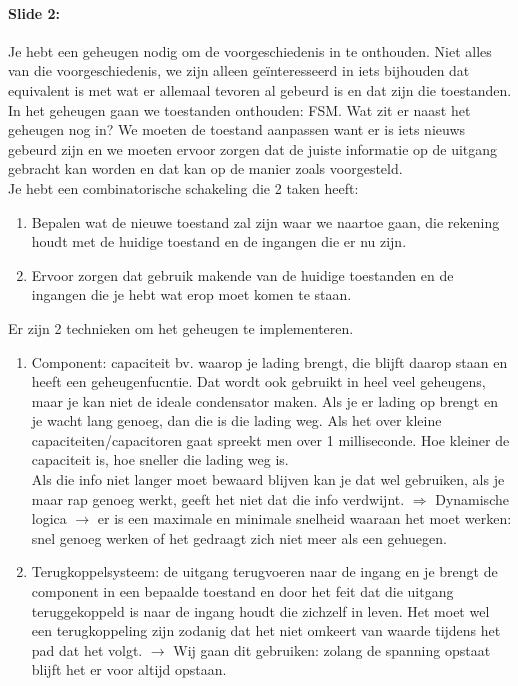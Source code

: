 \documentclass[10pt,a4paper]{book}
\begin{document}
\paragraph{Slide 2:} Je hebt een geheugen nodig om de voorgeschiedenis in te onthouden. Niet alles van die voorgeschiedenis, we zijn alleen ge\"interesseerd in iets bijhouden dat equivalent is met wat er allemaal tevoren al gebeurd is en dat zijn die toestanden. In het geheugen gaan we toestanden onthouden: FSM. Wat zit er naast het geheugen nog in? We moeten de toestand aanpassen want er is iets nieuws gebeurd zijn en we moeten ervoor zorgen dat de juiste informatie op de uitgang gebracht kan worden en dat kan op de manier zoals voorgesteld.\\
Je hebt een combinatorische schakeling die 2 taken heeft:
\begin{enumerate}
\item Bepalen wat de nieuwe toestand zal zijn waar we naartoe gaan, die rekening houdt met de huidige toestand en de ingangen die er nu zijn.	
\item Ervoor zorgen dat gebruik makende van de huidige toestanden en de ingangen die je hebt wat erop moet komen te staan.
\end{enumerate}	
Er zijn 2 technieken om het geheugen te implementeren.
\begin{enumerate}
\item Component: capaciteit bv. waarop je lading brengt, die blijft daarop staan en heeft een geheugenfucntie. Dat wordt ook gebruikt in heel veel geheugens, maar je kan niet de ideale condensator maken. Als je er lading op brengt en je wacht lang genoeg, dan die is die lading weg. Als het over kleine capaciteiten/capacitoren gaat spreekt men over 1 milliseconde. Hoe kleiner de capaciteit is, hoe sneller die lading weg is.\\
Als die info niet langer moet bewaard blijven kan je dat wel gebruiken, als je maar rap genoeg werkt, geeft het niet dat die info verdwijnt. $\Rightarrow$ Dynamische logica $\rightarrow$ er is een maximale en minimale snelheid waaraan het moet werken: snel genoeg werken of het gedraagt zich niet meer als een gehuegen.	
\item Terugkoppelsysteem: de uitgang terugvoeren naar de ingang en je brengt de component in een bepaalde toestand en door het feit dat die uitgang teruggekoppeld is naar de ingang houdt die zichzelf in leven. Het moet wel een terugkoppeling zijn zodanig dat het niet omkeert van waarde tijdens het pad dat het volgt. $\rightarrow$ Wij gaan dit gebruiken: zolang de spanning opstaat blijft het er voor altijd opstaan.
\end{enumerate}
\end{document}

